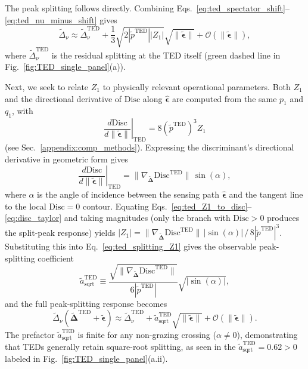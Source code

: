 \documentclass[%
  reprint,
  amsmath,amssymb,
  aps,
  prapplied,
  superscriptaddress,
  longbibliography]{revtex4-2}
\begin{document}
The peak splitting follows directly. Combining Eqs.~\ref{eq:ted_spectator_shift}--\ref{eq:ted_nu_minus_shift} gives
\begin{equation}\label{eq:ted_splitting_Z1}
    \tilde{\Delta}_\nu \approx \tilde{\Delta}_\nu^\text{TED} + \frac{1}{3}\sqrt{2|\tilde{p}^\text{TED}||Z_1|}\sqrt{\lVert\boldsymbol{\tilde{\epsilon}}\rVert} + \mathcal{O}(\lVert\boldsymbol{\tilde{\epsilon}}\rVert),
\end{equation}
where $\tilde{\Delta}_\nu^\text{TED}$ is the residual splitting at the TED itself (green dashed line in Fig.~\ref{fig:TED_single_panel}(a)).

Next, we seek to relate $Z_1$ to physically relevant operational parameters. Both $Z_1$ and the directional derivative of $\mathrm{Disc}$ along $\boldsymbol{\hat{\epsilon}}$ are computed from the same $p_1$ and $q_1$, with
\begin{equation}\label{eq:ted_Z1_to_disc}
    \left.\frac{d\mathrm{Disc}}{d\lVert\boldsymbol{\tilde{\epsilon}}\rVert}\right|_\text{TED} = 8(\tilde{p}^\text{TED})^3 Z_1
\end{equation}
(see Sec.~\ref{appendix:comp_methods}). Expressing the discriminant's directional derivative in geometric form gives
\begin{equation}\label{eq:disc_taylor}
    \left.\frac{d\mathrm{Disc}}{d\lVert\boldsymbol{\tilde{\epsilon}}\rVert}\right|_\text{TED} = \lVert\nabla_{\boldsymbol{\tilde{\Delta}}}\mathrm{Disc}^\text{TED}\rVert \, \sin(\alpha),
\end{equation}
where $\alpha$ is the angle of incidence between the sensing path $\boldsymbol{\hat{\epsilon}}$ and the tangent line to the local $\mathrm{Disc} = 0$ contour. Equating Eqs.~\ref{eq:ted_Z1_to_disc}--\ref{eq:disc_taylor} and taking magnitudes (only the branch with $\mathrm{Disc} > 0$ produces the split-peak response) yields $|Z_1| = \lVert\nabla_{\boldsymbol{\tilde{\Delta}}}\mathrm{Disc}^\text{TED}\rVert\,|\sin(\alpha)|\,/\,8|\tilde{p}^\text{TED}|^3$. Substituting this into Eq.~\ref{eq:ted_splitting_Z1} gives the observable peak-splitting coefficient
\begin{equation}\label{eq:ted_asqrt}
    \tilde{a}_\text{sqrt}^\text{TED} \equiv \frac{\sqrt{\lVert\nabla_{\boldsymbol{\tilde{\Delta}}}\mathrm{Disc}^\text{TED}\rVert}}{6|\tilde{p}^\text{TED}|}\sqrt{|\sin(\alpha)|},
\end{equation}
and the full peak-splitting response becomes
\begin{equation}\label{eq:ted_str}
    \tilde{\Delta}_\nu(\boldsymbol{\tilde{\Delta}}^\text{TED} + \boldsymbol{\tilde{\epsilon}}) \approx \tilde{\Delta}_\nu^\text{TED} + \tilde{a}_\text{sqrt}^\text{TED} \sqrt{\lVert\boldsymbol{\tilde{\epsilon}}\rVert} + \mathcal{O}(\lVert\boldsymbol{\tilde{\epsilon}}\rVert).
\end{equation}
The prefactor $\tilde{a}_\text{sqrt}^\text{TED}$ is finite for any non-grazing crossing ($\alpha \neq 0$), demonstrating that TEDs generally retain square-root splitting, as seen in the $\tilde{a}_\text{sqrt}^\text{TED} = 0.62 > 0$ labeled in Fig.~\ref{fig:TED_single_panel}(a.ii).
\end{document}
